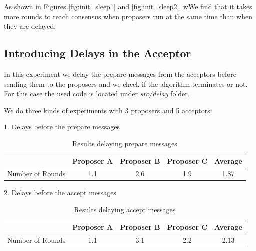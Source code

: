 As shown in Figures \ref{fig:init_sleep1} and \ref{fig:init_sleep2}, wWe find 
that it takes more rounds to reach consensus when proposers run at the 
same time than when they are delayed.
\newpage

\subsection{Introducing Delays in the Acceptor}
In this experiment we delay the prepare messages from the acceptors before sending
them to the proposers and we check if the algorithm terminates or not. For this case
the used code is located under \textit{src/delay} folder.

We do three kinds of experiments with 3 proposers and 5 acceptors:

1. Delays before the prepare messages\newline
\begin{table}[h!]
  \centering
  \begin{tabular}{ |c | c | c | c | c | }
    \hline
                     & Proposer A & Proposer B & Proposer C & Average \\ \hline
    Number of Rounds & 1.1 & 2.6 & 1.9 & 1.87  \\ \hline
  \end{tabular}
  \caption{Results delaying prepare messages}
  \label{table:1}
\end{table}

2. Delays before the accept messages\newline
\begin{table}[h!]
  \centering
  \begin{tabular}{ |c | c | c | c | c | }
    \hline
                     & Proposer A & Proposer B & Proposer C & Average \\ \hline
    Number of Rounds & 1.1 & 3.1 & 2.2 & 2.13  \\ \hline
  \end{tabular}
  \caption{Results delaying accept messages}
  \label{table:2}
\end{table}

